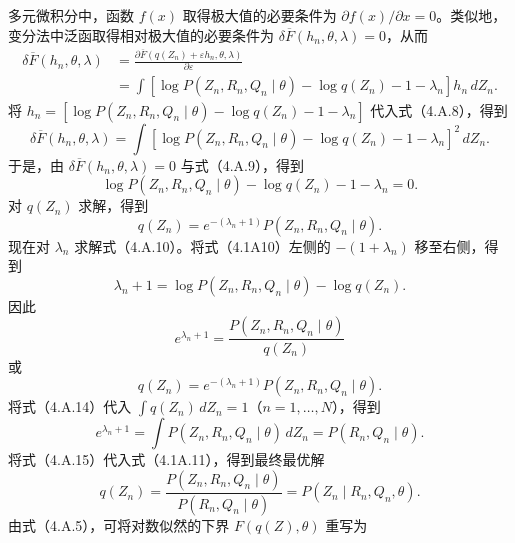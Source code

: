 多元微积分中，函数 $f(x)$ 取得极大值的必要条件为 $\partial f(x)/\partial x=0$。类似地，变分法中泛函取得相对极大值的必要条件为 $\delta\overline F(h_n,\theta,\lambda)=0$，从而
\begin{equation}
\begin{aligned}
\delta\overline F(h_n,\theta,\lambda)
&=\frac{\partial\overline F(q(Z_n)+\varepsilon h_n,\theta,\lambda)}{\partial\varepsilon}\\
&=\int[\log P(Z_n,R_n,Q_n\mid\theta)-\log q(Z_n)-1-\lambda_n]h_n\,dZ_n.
\end{aligned}\tag{4.A.8}
\end{equation}
将 $h_n=[\log P(Z_n,R_n,Q_n\mid\theta)-\log q(Z_n)-1-\lambda_n]$ 代入式（4.A.8），得到
\begin{equation}
\delta\overline F(h_n,\theta,\lambda)
=\int[\log P(Z_n,R_n,Q_n\mid\theta)-\log q(Z_n)-1-\lambda_n]^2\,dZ_n.\tag{4.A.9}
\end{equation}
于是，由 $\delta\overline F(h_n,\theta,\lambda)=0$ 与式（4.A.9），得到
\begin{equation}
\log P(Z_n,R_n,Q_n\mid\theta)-\log q(Z_n)-1-\lambda_n=0.\tag{4.A.10}
\end{equation}
对 $q(Z_n)$ 求解，得到
\begin{equation}
q(Z_n)=e^{-(\lambda_n+1)}P(Z_n,R_n,Q_n\mid\theta).\tag{4.A.11}
\end{equation}
现在对 $\lambda_n$ 求解式（4.A.10）。将式（4.1A10）左侧的 $-(1+\lambda_n)$ 移至右侧，得到
\begin{equation}
\lambda_n+1=\log P(Z_n,R_n,Q_n\mid\theta)-\log q(Z_n).\tag{4.A.12}
\end{equation}
因此
\begin{equation}
e^{\lambda_n+1}=\frac{P(Z_n,R_n,Q_n\mid\theta)}{q(Z_n)}\tag{4.A.13}
\end{equation}
或
\begin{equation}
q(Z_n)=e^{-(\lambda_n+1)}P(Z_n,R_n,Q_n\mid\theta).\tag{4.A.14}
\end{equation}
将式（4.A.14）代入 $\int q(Z_n)\,dZ_n=1$（$n=1,\ldots,N$），得到
\begin{equation}
e^{\lambda_n+1}=\int P(Z_n,R_n,Q_n\mid\theta)\,dZ_n
=P(R_n,Q_n\mid\theta).\tag{4.A.15}
\end{equation}
将式（4.A.15）代入式（4.1A.11），得到最终最优解
\begin{equation}
q(Z_n)=\frac{P(Z_n,R_n,Q_n\mid\theta)}{P(R_n,Q_n\mid\theta)}
=P(Z_n\mid R_n,Q_n,\theta).\tag{4.A.16}
\end{equation}
由式（4.A.5），可将对数似然的下界 $F(q(Z),\theta)$ 重写为
